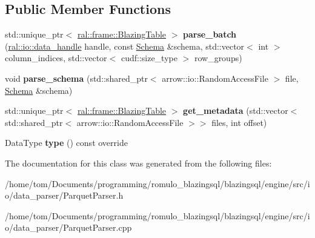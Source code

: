\subsection*{Public Member Functions}
\begin{DoxyCompactItemize}
\item 
\mbox{\label{classral_1_1io_1_1parquet__parser_a92203135608653a5a7a7594a63ef4a64}} 
std\+::unique\+\_\+ptr$<$ \hyperlink{classral_1_1frame_1_1BlazingTable}{ral\+::frame\+::\+Blazing\+Table} $>$ {\bfseries parse\+\_\+batch} (\hyperlink{structral_1_1io_1_1data__handle}{ral\+::io\+::data\+\_\+handle} handle, const \hyperlink{classral_1_1io_1_1Schema}{Schema} \&schema, std\+::vector$<$ int $>$ column\+\_\+indices, std\+::vector$<$ cudf\+::size\+\_\+type $>$ row\+\_\+groups)
\item 
\mbox{\label{classral_1_1io_1_1parquet__parser_aeae0917773d88f50a6851b3a79973520}} 
void {\bfseries parse\+\_\+schema} (std\+::shared\+\_\+ptr$<$ arrow\+::io\+::\+Random\+Access\+File $>$ file, \hyperlink{classral_1_1io_1_1Schema}{Schema} \&schema)
\item 
\mbox{\label{classral_1_1io_1_1parquet__parser_a30b2c688d97fe7c0532d4d0481c333ae}} 
std\+::unique\+\_\+ptr$<$ \hyperlink{classral_1_1frame_1_1BlazingTable}{ral\+::frame\+::\+Blazing\+Table} $>$ {\bfseries get\+\_\+metadata} (std\+::vector$<$ std\+::shared\+\_\+ptr$<$ arrow\+::io\+::\+Random\+Access\+File $>$$>$ files, int offset)
\item 
\mbox{\label{classral_1_1io_1_1parquet__parser_abf6b588cc6ce92c92af20d9c298007a8}} 
Data\+Type {\bfseries type} () const override
\end{DoxyCompactItemize}


The documentation for this class was generated from the following files\+:\begin{DoxyCompactItemize}
\item 
/home/tom/\+Documents/programming/romulo\+\_\+blazingsql/blazingsql/engine/src/io/data\+\_\+parser/Parquet\+Parser.\+h\item 
/home/tom/\+Documents/programming/romulo\+\_\+blazingsql/blazingsql/engine/src/io/data\+\_\+parser/Parquet\+Parser.\+cpp\end{DoxyCompactItemize}
